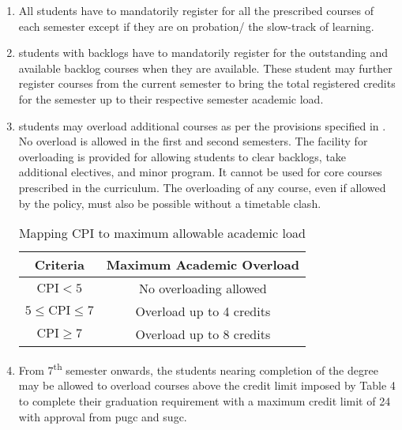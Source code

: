 \begin{enumerate}[leftmargin=15mm, resume]
    \item All \glspl{student} have to mandatorily register for all the prescribed courses of each semester except if they are on probation/ the slow-track of learning. 
    \item \Glspl{student} with backlogs have to mandatorily register for the outstanding and available backlog courses when they are available. These \gls{student} may further register courses from the current semester to bring the total registered credits for the semester up to their respective semester academic load.
    \item \Glspl{student} may overload additional courses as per the provisions specified in . No overload is allowed in the first and second semesters. The facility for overloading is provided for allowing \glspl{student} to clear backlogs, take additional electives, and minor program. It cannot be used for core courses prescribed in the curriculum. The overloading of any course, even if allowed by the policy, must also be possible without a timetable clash.

    \begin{table}[t]
        \centering
        \begin{tabular}{c c}
        \toprule
        \textbf{Criteria}   & \textbf{Maximum Academic Overload} \\
        \midrule
        {} {} $\mathrm{CPI}< 5$   & No overloading allowed \\
        $5 \leq \mathrm{CPI} \le  7$   & Overload up to 4 credits \\
        {} {} $\mathrm{CPI} \geq  7$   & Overload up to 8 credits \\
       \bottomrule
        \end{tabular}
        \caption{Mapping CPI to maximum allowable academic load}
        \label{tab:Mapping CPI to maximum allowable academic load}
    \end{table}

    \item From 7\textsuperscript{th} semester onwards, the \glspl{student} nearing completion of the degree may be allowed to overload courses above the credit limit imposed by Table 4 to complete their graduation requirement with a maximum credit limit of 24 with approval from \acrshort{pugc} and \acrshort{sugc}. 
\end{enumerate}

